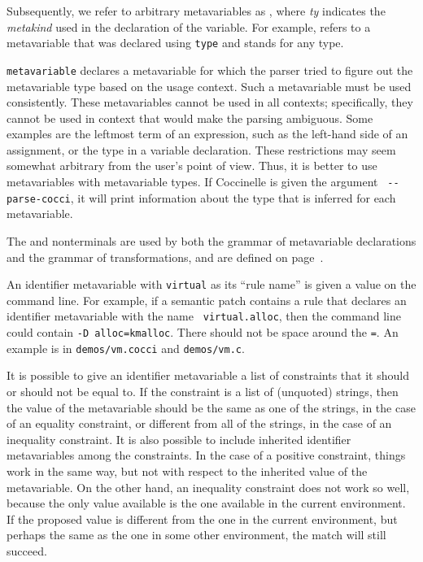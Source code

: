 Subsequently, we refer to arbitrary metavariables as
, where {\it{ty}}
indicates the {\it metakind} used in the declaration of the variable.
For example,  refers to a metavariable
that was declared using \texttt{type} and stands for any type.

{\tt metavariable} declares a metavariable for which the parser tried to
figure out the metavariable type based on the usage context.  Such a
metavariable must be used consistently.  These metavariables cannot be used
in all contexts; specifically, they cannot be used in context that would
make the parsing ambiguous.  Some examples are the leftmost term of an
expression, such as the left-hand side of an assignment, or the type in a
variable declaration.  These restrictions may seem somewhat arbitrary from
the user's point of view.  Thus, it is better to use metavariables with
metavariable types.  If Coccinelle is given the argument {\tt
  -{}-parse-cocci}, it will print information about the type that is inferred
for each metavariable.

The  and  nonterminals are used by both the grammar of
metavariable declarations and the grammar of transformations, and are
defined on page~\pageref{types}.

An identifier metavariable with {\tt virtual} as its ``rule name'' is given
a value on the command line.  For example, if a semantic patch contains a
rule that declares an identifier metavariable with the name {\tt
  virtual.alloc}, then the command line could contain {\tt -D
  alloc=kmalloc}.  There should not be space around the {\tt =}.  An
example is in {\tt demos/vm.cocci} and {\tt demos/vm.c}.

It is possible to give an identifier metavariable a list of constraints
that it should or should not be equal to.  If the constraint is a list of
(unquoted) strings, then the value of the metavariable should be the same
as one of the strings, in the case of an equality constraint, or different
from all of the strings, in the case of an inequality constraint.  It is
also possible to include inherited identifier metavariables among the
constraints.  In the case of a positive constraint, things work in the same
way, but not with respect to the inherited value of the metavariable.  On
the other hand, an inequality constraint does not work so well, because the
only value available is the one available in the current environment.  If
the proposed value is different from the one in the current environment,
but perhaps the same as the one in some other environment, the match will
still succeed.

